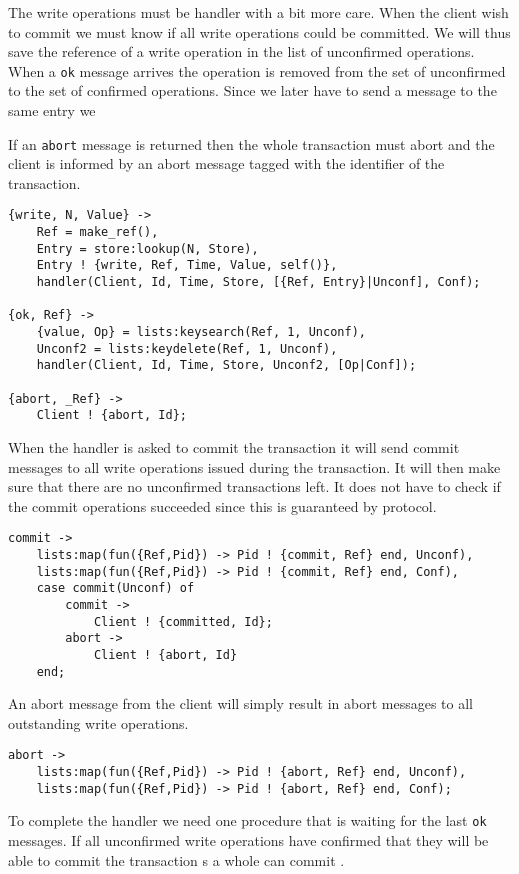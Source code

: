 \documentclass[a4paper, 11pt]{article}
\begin{document}
The write operations must be handler with a bit more care. When the
client wish to commit we must know if all write operations could be
committed. We will thus save the reference of a write operation in the
list of unconfirmed operations. When a {\tt ok} message arrives the
operation is removed from the set of unconfirmed to the set of
confirmed operations. Since we later have to send a message to the same entry we 

If an {\tt abort} message is returned then the whole transaction must
abort and the client is informed by an abort message tagged with the
identifier of the transaction.

\begin{verbatim}
{write, N, Value} ->
    Ref = make_ref(),
    Entry = store:lookup(N, Store),
    Entry ! {write, Ref, Time, Value, self()},
    handler(Client, Id, Time, Store, [{Ref, Entry}|Unconf], Conf);

{ok, Ref} ->
    {value, Op} = lists:keysearch(Ref, 1, Unconf),
    Unconf2 = lists:keydelete(Ref, 1, Unconf),
    handler(Client, Id, Time, Store, Unconf2, [Op|Conf]);           

{abort, _Ref} ->
    Client ! {abort, Id};
\end{verbatim}

When the handler is asked to commit the transaction it will send
commit messages to all write operations issued during the
transaction. It will then make sure that there are no unconfirmed
transactions left. It does not have to check if the commit operations
succeeded since this is guaranteed by protocol. 

\begin{verbatim}
commit ->
    lists:map(fun({Ref,Pid}) -> Pid ! {commit, Ref} end, Unconf),
    lists:map(fun({Ref,Pid}) -> Pid ! {commit, Ref} end, Conf),
    case commit(Unconf) of
        commit ->
            Client ! {committed, Id};
        abort ->
            Client ! {abort, Id}
    end;
\end{verbatim}

An abort message from the client will simply result in abort messages
to all outstanding write operations.

\begin{verbatim}
abort ->
    lists:map(fun({Ref,Pid}) -> Pid ! {abort, Ref} end, Unconf),
    lists:map(fun({Ref,Pid}) -> Pid ! {abort, Ref} end, Conf);
\end{verbatim}

To complete the handler we need one procedure that is waiting for the
last {\tt ok} messages. If all unconfirmed write operations have
confirmed that they will be able to commit the transaction s a whole
can commit .
\end{document}
